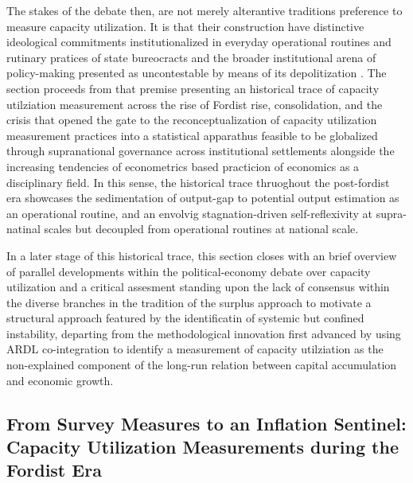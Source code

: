 \documentclass[11pt,a4paper]{article}
\begin{document}
The stakes of the debate then, are not merely alterantive traditions preference to measure capacity utilization. It is that their construction have distinctive ideological commitments institutionalized in everyday operational routines and rutinary pratices of state bureocracts and the broader institutional arena of policy-making presented as uncontestable by means of its depolitization \citep{Best2025}. The section proceeds from that premise presenting an historical trace of capacity utilziation measurement across the rise of Fordist rise, consolidation, and the crisis that opened the gate to the reconceptualization of capacity utilization measurement practices into a statistical apparathus feasible to be globalized through supranational governance across institutional settlements alongside the increasing tendencies of econometrics based practicion of economics as a disciplinary field. In this sense, the historical trace thruoghout the post-fordist era showcases the sedimentation of output-gap to potential output estimation as an operational routine, and an envolvig stagnation-driven self-reflexivity at supra-natinal scales but decoupled from operational routines at national scale.

In a later stage of this historical trace, this section closes with an brief overview of parallel developments within the political-economy debate over capacity utilization and a critical assesment standing upon the lack of consensus within the diverse branches in the tradition of the  surplus approach to motivate a structural approach featured by the identificatin of systemic but confined instability, departing from the methodological innovation first advanced by \citet{Shaikh2016} using ARDL co-integration to identify a measurement of capacity utilziation as the non-explained component of the long-run relation between capital accumulation and economic growth. 

\subsection{From Survey Measures to an Inflation Sentinel: Capacity Utilization Measurements during the Fordist Era}
\label{subsec:21_fordist_capacity_utilization}
\end{document}
